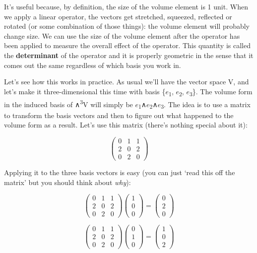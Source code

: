 \documentclass[oneside,english]{amsbook}
\numberwithin{section}{chapter}
\theoremstyle{plain}
\theoremstyle{definition}
\begin{document}
It's useful because, by definition, the size of the volume element is 1
unit. When we apply a linear operator, the vectors get stretched,
squeezed, reflected or rotated (or some combination of those things):
the volume element will probably change size. We can use the size of the
volume element after the operator has been applied to measure the
overall effect of the operator. This quantity is called the
\textbf{determinant} of the operator and it is properly geometric in the
sense that it comes out the same regardless of which basis you work in.

Let's see how this works in practice. As usual we'll have the vector
space V, and let's make it three-dimensional this time with basis
\{$e$\textsubscript{1}, $e$\textsubscript{2},
$e$\textsubscript{3}\}. The volume form in the induced basis of
∧\textsuperscript{3}V will simply be
$e$\textsubscript{1}∧$e$\textsubscript{2}∧$e$\textsubscript{3}.
The idea is to use a matrix to transform the basis vectors and then to
figure out what happened to the volume form as a result. Let's use this
matrix (there's nothing special about it):

\[\begin{pmatrix}
	0 & 1 & 1 \\
	2 & 0 & 2 \\
	0 & 2 & 0
\end{pmatrix}\]

Applying it to the three basis vectors is easy (you can just `read this
off the matrix' but you should think about \emph{why}):

\[\begin{pmatrix}
	0 & 1 & 1 \\
	2 & 0 & 2 \\
	0 & 2 & 0
\end{pmatrix}\begin{pmatrix}
	1 \\
	0 \\
	0
\end{pmatrix} = \begin{pmatrix}
	0 \\
	2 \\
	0
\end{pmatrix}\]

\[\begin{pmatrix}
	0 & 1 & 1 \\
	2 & 0 & 2 \\
	0 & 2 & 0
\end{pmatrix}\begin{pmatrix}
	0 \\
	1 \\
	0
\end{pmatrix} = \begin{pmatrix}
	1 \\
	0 \\
	2
\end{pmatrix}\]
\end{document}
